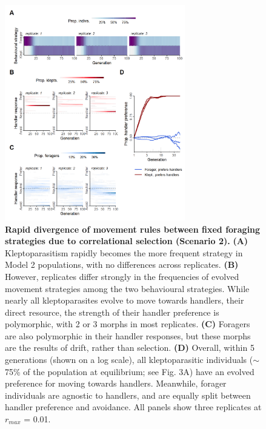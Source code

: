 \documentclass[11pt]{article}
\begin{document}
\begin{figure}[h!]
    \centering
    \includegraphics[width=0.70\textwidth]{figures/fig_07.png}
    \caption{
       \textbf{Rapid divergence of movement rules between fixed foraging strategies due to correlational selection (Scenario 2).}
       \textbf{(A)} Kleptoparasitism rapidly becomes the more frequent strategy in Model 2 populations, with no differences across replicates.
       \textbf{(B)} However, replicates differ strongly in the frequencies of evolved movement strategies among the two behavioural strategies.
       While nearly all kleptoparasites evolve to move towards handlers, their direct resource, the strength of their handler preference is polymorphic, with 2 or 3 morphs in most replicates.
       \textbf{(C)} Foragers are also polymorphic in their handler responses, but these morphs are the results of drift, rather than selection.
       \textbf{(D)} Overall, within 5 generations (shown on a log scale), all kleptoparasitic individuals ($\sim$75\% of the population at equilibrium; see Fig. 3A) have an evolved preference for moving towards handlers.
       Meanwhile, forager individuals are agnostic to handlers, and are equally split between handler preference and avoidance.
       All panels show three replicates at $r_{max}$ = 0.01.
    }
    \label{Fig:Syndrome}
\end{figure}
\end{document}

